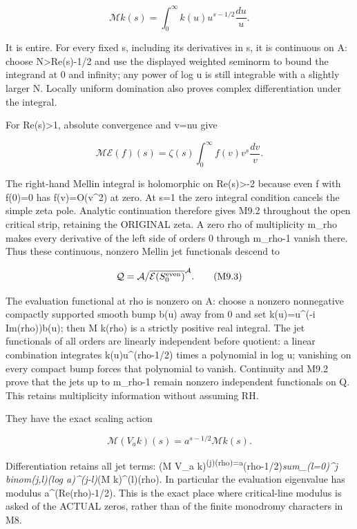 \documentclass[
]{article}
\begin{document}
\[
\mathcal M k(s)=\int_0^\infty k(u)u^{s-1/2}\frac{du}{u}.
\tag{M9.1}
\]

It is entire. For every fixed s, including its derivatives in s, it is
continuous on A: choose N\textgreater\textbar Re(s)-1/2\textbar{} and
use the displayed weighted seminorm to bound the integrand at 0 and
infinity; any power of \textbar log u\textbar{} is still integrable with
a slightly larger N. Locally uniform domination also proves complex
differentiation under the integral.

For Re(s)\textgreater1, absolute convergence and v=nu give

\[
\mathcal M\mathcal E(f)(s)=\zeta(s)
\int_0^\infty f(v)v^s\frac{dv}{v}.
\tag{M9.2}
\]

The right-hand Mellin integral is holomorphic on Re(s)\textgreater-2
because even f with f(0)=0 has f(v)=O(v\^{}2) at zero. At s=1 the zero
integral condition cancels the simple zeta pole. Analytic continuation
therefore gives M9.2 throughout the open critical strip, retaining the
ORIGINAL zeta. A zero rho of multiplicity m\_rho makes every derivative
of the left side of orders 0 through m\_rho-1 vanish there. Thus these
continuous, nonzero Mellin jet functionals descend to

\[
\mathcal Q=\mathcal A/\overline{\mathcal E(S_0^{\rm even})}^{\mathcal A}.
\tag{M9.3}
\]

The evaluation functional at rho is nonzero on A: choose a nonzero
nonnegative compactly supported smooth bump b(u) away from 0 and set
k(u)=u\^{}(-i Im(rho))b(u); then M k(rho) is a strictly positive real
integral. The jet functionals of all orders are linearly independent
before quotient: a linear combination integrates k(u)u\^{}(rho-1/2)
times a polynomial in log u; vanishing on every compact bump forces that
polynomial to vanish. Continuity and M9.2 prove that the jets up to
m\_rho-1 remain nonzero independent functionals on Q. This retains
multiplicity information without assuming RH.

They have the exact scaling action

\[
\mathcal M(V_a k)(s)=a^{s-1/2}\mathcal M k(s).
\tag{M9.4}
\]

Differentiation retains all jet terms: (M V\_a
k)\textsuperscript{(j)(rho)=a}(rho-1/2)\emph{sum\_(l=0)\^{}j
binom(j,l)(log a)\^{}(j-l)}(M k)\^{}(l)(rho). In particular the
evaluation eigenvalue has modulus a\^{}(Re(rho)-1/2). This is the exact
place where critical-line modulus is asked of the ACTUAL zeros, rather
than of the finite monodromy characters in M8.
\end{document}
